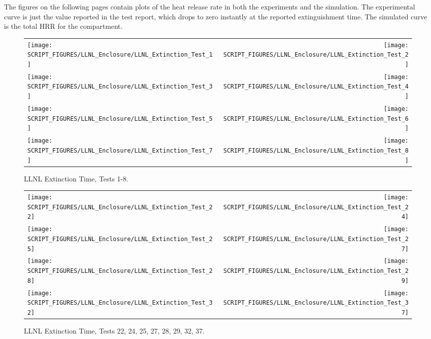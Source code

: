 The figures on the following pages contain plots of the heat release rate in both the experiments and the simulation. The experimental curve is just the value reported in the test report, which drops to zero instantly at the reported extinguishment time. The simulated curve is the total HRR for the compartment.

\newpage

\begin{figure}[p]
\begin{tabular*}{\textwidth}{l@{\extracolsep{\fill}}r}
\texttt{[image: SCRIPT\_FIGURES/LLNL\_Enclosure/LLNL\_Extinction\_Test\_1]} &
\texttt{[image: SCRIPT\_FIGURES/LLNL\_Enclosure/LLNL\_Extinction\_Test\_2]} \\
\texttt{[image: SCRIPT\_FIGURES/LLNL\_Enclosure/LLNL\_Extinction\_Test\_3]} &
\texttt{[image: SCRIPT\_FIGURES/LLNL\_Enclosure/LLNL\_Extinction\_Test\_4]} \\
\texttt{[image: SCRIPT\_FIGURES/LLNL\_Enclosure/LLNL\_Extinction\_Test\_5]} &
\texttt{[image: SCRIPT\_FIGURES/LLNL\_Enclosure/LLNL\_Extinction\_Test\_6]} \\
\texttt{[image: SCRIPT\_FIGURES/LLNL\_Enclosure/LLNL\_Extinction\_Test\_7]} &
\texttt{[image: SCRIPT\_FIGURES/LLNL\_Enclosure/LLNL\_Extinction\_Test\_8]}
\end{tabular*}
\caption{LLNL Extinction Time, Tests 1-8.}
\label{LLNL_Extinction_1}
\end{figure}

\begin{figure}[p]
\begin{tabular*}{\textwidth}{l@{\extracolsep{\fill}}r}
\texttt{[image: SCRIPT\_FIGURES/LLNL\_Enclosure/LLNL\_Extinction\_Test\_22]} &
\texttt{[image: SCRIPT\_FIGURES/LLNL\_Enclosure/LLNL\_Extinction\_Test\_24]} \\
\texttt{[image: SCRIPT\_FIGURES/LLNL\_Enclosure/LLNL\_Extinction\_Test\_25]} &
\texttt{[image: SCRIPT\_FIGURES/LLNL\_Enclosure/LLNL\_Extinction\_Test\_27]} \\
\texttt{[image: SCRIPT\_FIGURES/LLNL\_Enclosure/LLNL\_Extinction\_Test\_28]} &
\texttt{[image: SCRIPT\_FIGURES/LLNL\_Enclosure/LLNL\_Extinction\_Test\_29]} \\
\texttt{[image: SCRIPT\_FIGURES/LLNL\_Enclosure/LLNL\_Extinction\_Test\_32]} &
\texttt{[image: SCRIPT\_FIGURES/LLNL\_Enclosure/LLNL\_Extinction\_Test\_37]}
\end{tabular*}
\caption{LLNL Extinction Time, Tests 22, 24, 25, 27, 28, 29, 32, 37.}
\label{LLNL_Extinction_2}
\end{figure}


